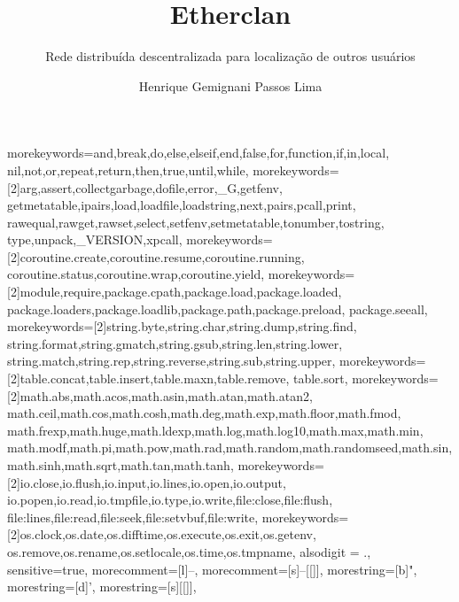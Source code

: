 \documentclass[brazil]{beamer}
\title{
  Etherclan
}
\subtitle{
  Rede distribuída descentralizada para localização de outros usuários
}
\author{Henrique Gemignani Passos Lima}
\begin{document}
  {morekeywords={and,break,do,else,elseif,end,false,for,function,if,in,local,
     nil,not,or,repeat,return,then,true,until,while},
   morekeywords={[2]arg,assert,collectgarbage,dofile,error,_G,getfenv,
     getmetatable,ipairs,load,loadfile,loadstring,next,pairs,pcall,print,
     rawequal,rawget,rawset,select,setfenv,setmetatable,tonumber,tostring,
     type,unpack,_VERSION,xpcall},
   morekeywords={[2]coroutine.create,coroutine.resume,coroutine.running,
     coroutine.status,coroutine.wrap,coroutine.yield},
   morekeywords={[2]module,require,package.cpath,package.load,package.loaded,
     package.loaders,package.loadlib,package.path,package.preload,
     package.seeall},
   morekeywords={[2]string.byte,string.char,string.dump,string.find,
     string.format,string.gmatch,string.gsub,string.len,string.lower,
     string.match,string.rep,string.reverse,string.sub,string.upper},
   morekeywords={[2]table.concat,table.insert,table.maxn,table.remove,
   table.sort},
   morekeywords={[2]math.abs,math.acos,math.asin,math.atan,math.atan2,
     math.ceil,math.cos,math.cosh,math.deg,math.exp,math.floor,math.fmod,
     math.frexp,math.huge,math.ldexp,math.log,math.log10,math.max,math.min,
     math.modf,math.pi,math.pow,math.rad,math.random,math.randomseed,math.sin,
     math.sinh,math.sqrt,math.tan,math.tanh},
   morekeywords={[2]io.close,io.flush,io.input,io.lines,io.open,io.output,
     io.popen,io.read,io.tmpfile,io.type,io.write,file:close,file:flush,
     file:lines,file:read,file:seek,file:setvbuf,file:write},
   morekeywords={[2]os.clock,os.date,os.difftime,os.execute,os.exit,os.getenv,
     os.remove,os.rename,os.setlocale,os.time,os.tmpname},
   alsodigit = {.},
   sensitive=true,
   morecomment=[l]{--},
   morecomment=[s]{--[[}{]]},
   morestring=[b]",
   morestring=[d]',
   morestring=[s]{[[}{]]},
  }


\frame{\tableofcontents}

\end{document}
